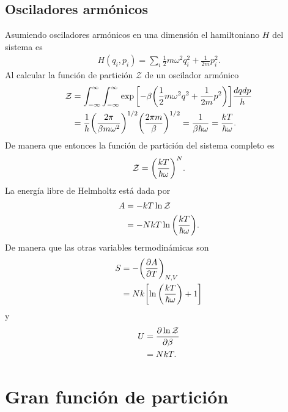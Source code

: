 \subsection{Osciladores armónicos}
Asumiendo osciladores armónicos en una dimensión el hamiltoniano
$H$ del sistema es 
\begin{align}
H(q_i,p_i)=\sum_i\frac{1}{2}m\omega^2q_i^2+\frac{1}{2m}p_i^2.
\end{align}
Al calcular la función de partición $\mathcal{Z}$ de un oscilador armónico
\begin{align}
\mathcal{Z}&=\int _{-\infty}^{\infty}\int _{-\infty}^{\infty}
\exp\qty[-\beta\qty(\frac{1}{2}m\omega^2q^2+\frac{1}{2m}p^2)]
\frac{dqdp}{h}\nonumber\\
&=\frac{1}{h}\qty(\frac{2\pi}{\beta m\omega^2})^{1/2}
\qty(\frac{2\pi m}{\beta})^{1/2}=
\frac{1}{\beta\hbar\omega}=\frac{kT}{\hbar\omega}.
\end{align}
De manera que entonces la función de partición del sistema 
completo es 
\begin{align}
\mathcal{Z}=\qty(\frac{kT}{\hbar\omega})^N.
\end{align}
La energía libre de Helmholtz está dada por 
\begin{align}
A&=-kT\ln \mathcal{Z}\nonumber\\
&=-NkT\ln\qty(\frac{kT}{\hbar\omega}).
\end{align}
De manera que las otras variables termodinámicas son
\begin{align}
S&=-\qty(\pdv{A}{T})_{N,V}\nonumber\\
&=Nk\qty[\ln\qty(\frac{kT}{\hbar\omega})+1]
\end{align}
y 
\begin{align}
U&=\pdv{\ln\mathcal{Z}}{\beta}\nonumber\\
&=NkT.
\end{align}

\section{Gran función de partición}
